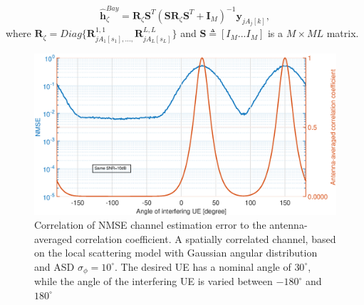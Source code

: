 \begin{equation}
\hat{\mathbf{h}}_{\zeta}^{Bay}=\mathbf{R}_{\zeta}\mathbf{S}^{T}%
(\mathbf{S}\mathbf{R}_{\zeta}\mathbf{S}^{T}+\mathbf{I}_{M})^{-1}\mathbf{y}_{jA_{j}[k]},
\end{equation}
where $\mathbf{R}_{\zeta}=Diag\{\mathbf{R}^{1,1}_{jA_{1}[s_{1}],...,}\mathbf{R}^{L,L}_{jA_{L}[s_{L}]}\} $ and %
$\mathbf{S}\triangleq[I_{M}...I_{M}]$ is a $M\times ML$ matrix.





\begin{figure}[t!]
	\centering
	\includegraphics[width=1.0\linewidth]{figures/NMSE_correlation.eps}
	\caption{Correlation of NMSE channel estimation error to the antenna-averaged correlation coefficient. A spatially correlated channel, based on
the local scattering model with Gaussian angular distribution and ASD $ \sigma_\phi= 10^\circ$. The desired UE has a nominal angle of $30^\circ$, while the angle of the interfering UE
is varied between $-180^\circ$ and $180^\circ$}
	\label{fig:channel_correlation_model}
\end{figure}

